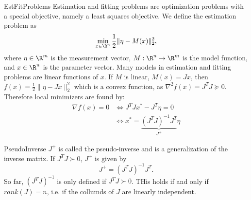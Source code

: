 \begin{theo}{EstFitProblems}
    Estimation and fitting problems are optimization problems with a special objective, namely a least squares objective. We define the estimation problem as
    \begin{equation*}
        \min_{x \in \R^n} \frac{1}{2} \| \eta - M(x) \|^2_2,
    \end{equation*}
    where $\eta \in \R^m$ is the measurement vector, $M: \R^n \to \R^m$ is the model function, and $x \in \R^n$ is the parameter vector.  Many models in estimation and fitting problems are linear functions of $x$. If $M$ is linear, $M(x) = Jx$, then $f(x) = \frac{1}{2} \| \eta - Jx \|^2_2$ which is a convex function, as $\nabla^2 f(x) = J^T J \succeq 0$. Therefore local minimizers are found by:
    \begin{align*}
        \nabla f(x) = 0 
            &\Leftrightarrow J^T J x^* - J^T \eta = 0 \\
            &\Leftrightarrow x^* = \underbrace{{(J^T J)}^{-1} J^T}_{J^+} \eta
    \end{align*}
    \vspace*{-0.5cm}
\end{theo}

\begin{theo}{PseudoInverse}
    $J^+$ is called the pseudo-inverse and is a generalization of the inverse matrix. If $J^T J \succ 0$, $J^+$ is given by 
    \begin{equation*}
        J^+ = {(J^T J)}^{-1} J^T.
    \end{equation*}
    So far, ${(J^T J)}^{-1}$ is only defined if $J^T J \succ 0$. THis holds if and only if $rank(J) = n$, i\@.e\@. if the collumds of $J$ are linearly independent. 
\end{theo}

